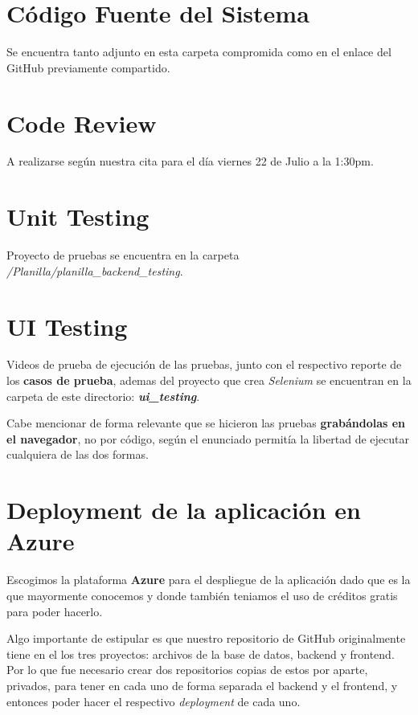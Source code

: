 \documentclass{article}
\begin{document}
%

\section{Código Fuente del Sistema}
Se encuentra tanto adjunto en esta carpeta compromida como en el enlace del GitHub
previamente compartido.

\section{Code Review}
A realizarse según nuestra cita para el día viernes 22 de Julio a la 1:30pm.

\section{Unit Testing}
Proyecto de pruebas se encuentra en la carpeta \textit{/Planilla/planilla\_backend\_testing}.

\section{UI Testing}
Videos de prueba de ejecución de las pruebas, junto con el respectivo reporte de los
\textbf{casos de prueba}, ademas del proyecto que crea \textit{Selenium} se encuentran
en la carpeta de este directorio: \textbf{\textit{ui\_testing}}.

Cabe mencionar de forma relevante que se hicieron las pruebas \textbf{grabándolas en el navegador},
no por código, según el enunciado permitía la libertad de ejecutar cualquiera de las dos formas.

\section{Deployment de la aplicación en Azure}
Escogimos la plataforma \textbf{Azure} para el despliegue de la aplicación dado que es la que
mayormente conocemos y donde también teniamos el uso de créditos gratis para poder hacerlo.

Algo importante de estipular es que nuestro repositorio de GitHub originalmente tiene en
el los tres proyectos: archivos de la base de datos, backend y frontend. Por lo que fue
necesario crear dos repositorios copias de estos por aparte, privados, para tener en cada
uno de forma separada el backend y el frontend, y entonces poder hacer el respectivo
\textit{deployment} de cada uno.
\end{document}
